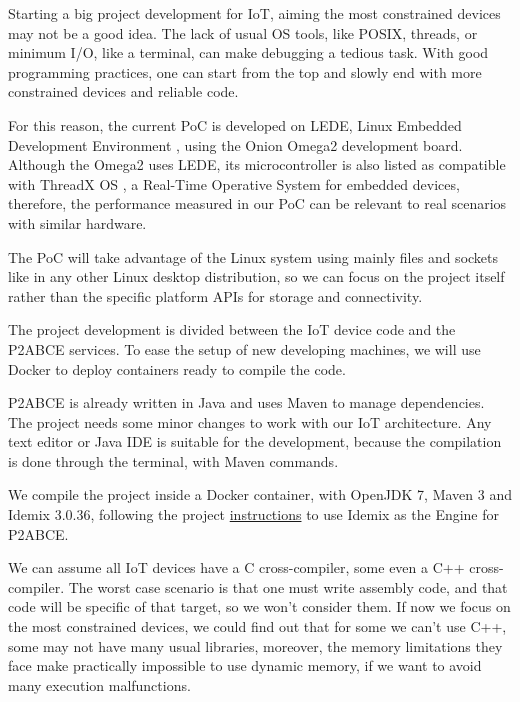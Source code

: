 Starting a big project development for \ac{IoT}, aiming the most constrained devices may not be a good idea. The lack of usual OS tools, like POSIX, threads, or minimum I/O, like a terminal, can make debugging a tedious task. With good programming practices, one can start from the top and slowly end with more constrained devices and reliable code.


For this reason, the current \ac{PoC} is developed on LEDE, Linux Embedded Development Environment \citep{ledeproject}, using the Onion Omega2 development board. Although the Omega2 uses LEDE, its microcontroller is also listed as compatible with ThreadX OS \citep{THREADX}, a Real-Time Operative System for embedded devices, therefore, the performance measured in our PoC can be relevant to real scenarios with similar hardware.

The PoC will take advantage of the Linux system using mainly files and sockets like in any other Linux desktop distribution, so we can focus on the project itself rather than the specific platform APIs for storage and connectivity.


\hfil

The project development is divided between the IoT device code and the P2ABCE services. To ease the setup of new developing machines, we will use Docker to deploy containers ready to compile the code.

\hfil

P2ABCE is already written in Java and uses Maven to manage dependencies. The project needs some minor changes to work with our IoT architecture. Any text editor or Java IDE is suitable for the development, because the compilation is done through the terminal, with Maven commands.

We compile the project inside a Docker container, with OpenJDK 7, Maven 3 and Idemix 3.0.36, following the project \href{https://github.com/p2abcengine/p2abcengine/wiki/How-to-Build-the-ABC-Engine}{instructions} to use Idemix as the Engine for P2ABCE.

\hfil

We can assume all IoT devices have a C cross-compiler, some even a C++ cross-compiler. The worst case scenario is that one must write assembly code, and that code will be specific of that target, so we won't consider them.
If now we focus on the most constrained devices, we could find out that for some we can't use C++, some may not have many usual libraries, moreover, the memory limitations they face make practically impossible to use dynamic memory, if we want to avoid many execution malfunctions.


